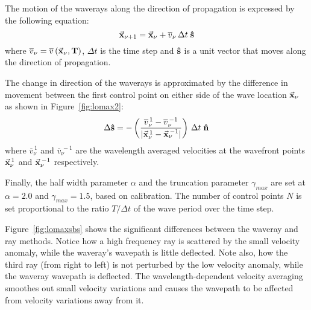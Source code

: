 The motion of the waverays along the direction of propagation 
is expressed by the following equation:
%
\begin{equation}
 \vec{\bf x}_{\nu+1} = \vec{\bf x}_{\nu} + 
 \overline{v}_{\nu}\, \Delta t\; {\bf \hat{s}}
\label{eqn:mvwavpt}
\end{equation}
%
where $\overline{v}_{\nu} = \overline{v}\, (\vec{\bf x}_{\nu},{\bf T\/})$,
$\Delta t$ is the time step and ${\bf \hat{s}}$ is a unit vector
that moves along the direction of propagation.


The change in direction of the waverays is approximated by the 
difference in movement between the first control point on either
side of the wave location $\vec{\bf x}_{\nu}$ as shown in
Figure~\ref{fig:lomax2}:
%
\begin{equation}
 \Delta {\bf \hat{s}} = - \left( \frac{
    \overline{v}_{\nu}^{\, 1} - \overline{v}_{\nu}^{\, -1}}
    {| \vec{\bf x}_{\nu}^{\, 1} - \vec{\bf x}_{\nu}^{\, -1} |} \right) \,
 \Delta t \; {\bf \hat{n}}
\label{eqn:cdir}
\end{equation}
%
where $\overline{v}_{\nu}^{\, 1}$ and $\overline{v}_{\nu}^{\, -1}$
are the wavelength averaged velocities at the wavefront points
$\vec{\bf x}_{\nu}^{\, 1}$ and $\vec{\bf x}_{\nu}^{\, -1}$
respectively.

Finally, the half width parameter $\alpha$ and the truncation 
parameter $\gamma_{max}$ are set at $\alpha = 2.0$
and $\gamma_{max} = 1.5$, based on \cite{Lomax}
calibration. The number of control points $N$ is set 
proportional to the ratio $T/\Delta t$ of the wave period over the 
time step. 

Figure~\ref{fig:lomaxsbs} shows the significant differences between
the waveray and ray methods. Notice how a high frequency ray
is scattered by the small velocity anomaly,
while the waveray's wavepath is little deflected. Note also, how the
third ray (from right to left) is not perturbed by the low velocity
anomaly, while the waveray wavepath is deflected.
The wavelength-dependent velocity averaging smoothes out
small velocity variations and causes the wavepath to be affected
from velocity variations away from it.




